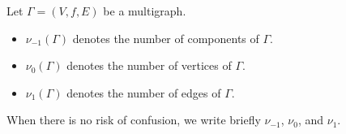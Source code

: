 Let $\Gamma = (V, f, E)$ be a multigraph.
\begin{itemize}
\item $\nu_{-1}(\Gamma)$ denotes the number of components of $\Gamma$.
\item $\nu_0(\Gamma)$ denotes the number of vertices of $\Gamma$.
\item $\nu_1(\Gamma)$ denotes the number of edges of $\Gamma$.
\end{itemize}
When there is no risk of confusion, we write briefly $\nu_{-1}$, $\nu_0$, and $\nu_1$.

